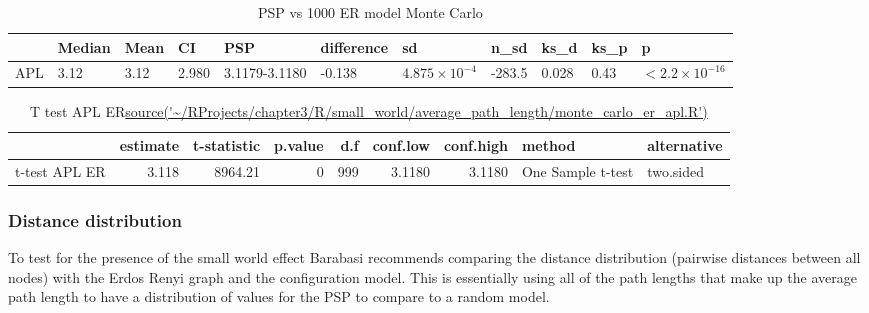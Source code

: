 \begin{table}[ht]
\centering
\begin{adjustbox}{width=\textwidth}
\begin{tabular}{lllllllllll}
  \toprule
 & Median & Mean & CI& PSP & difference & sd & n\_sd & ks\_d & ks\_p & p \\ 
  \midrule
APL & 3.12 & 3.12 & 2.980 &3.1179-3.1180 & -0.138 & $4.875 \times 10^{-4}$ & -283.5 & 0.028 & 0.43 & $<2.2 \times 10^{-16}$ \\ 
 
   \bottomrule
\end{tabular}
\end{adjustbox}
\caption{PSP vs 1000 ER model Monte Carlo} 
\end{table}




 
 
\begin{table}[ht]
\centering
\begin{adjustbox}{width=\textwidth}
\begin{tabular}{lrrrrrrll}
  \toprule
 & estimate & t-statistic & p.value & d.f & conf.low & conf.high & method & alternative \\ 
  \midrule
t-test APL ER & 3.118 & 8964.21 &    0 & 999 & 3.1180 & 3.1180 & One Sample t-test & two.sided \\ 
   \bottomrule
   
\end{tabular}
\end{adjustbox}
\caption{T test APL ER\url{source('~/RProjects/chapter3/R/small_world/average_path_length/monte_carlo_er_apl.R')}}
\end{table}


\subsubsection{Distance distribution}

To test for the presence of the small world effect Barabasi recommends comparing the distance distribution (pairwise distances between all nodes) with the Erdos Renyi graph and the configuration model. This is essentially using all of the path lengths that make up the average path length to have a distribution of values for the PSP to compare to a random model.

